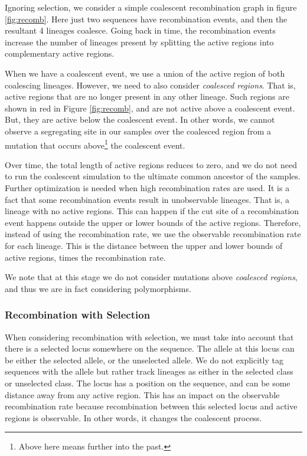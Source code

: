 \documentclass{article}
\begin{document}
Ignoring selection, we consider a simple coalescent recombination graph in
figure \ref{fig:recomb}. Here just two sequences have recombination
events, and then the resultant 4 lineages coalesce. Going back in time, the
recombination events increase the number of lineages present by splitting the
active regions into complementary active regions. 

When we have a coalescent event, we use a union of the active region of both
coalescing lineages. However, we need to also consider {\it coalesced regions}.
That is, active regions that are no longer present in any other lineage. Such
regions are shown in red in Figure \ref{fig:recomb}, and are not active above a
coalescent event. But, they are active below the coalescent event. In other
words, we cannot observe a segregating site in our samples over the coalesced
region from a mutation that occurs above\footnote{Above here means further into
the past.} the coalescent event.

Over time, the total length of active regions reduces to zero, and we do not
need to run the coalescent simulation to the ultimate common ancestor of the samples.
Further optimization is needed when high recombination rates are used. It
is a fact that some recombination events result in unobservable lineages.
That is, a lineage with no active regions. This can happen if the cut site of a
recombination event happens outside the upper or lower bounds of the active
regions. Therefore, instead of using the recombination rate, we use the
observable recombination rate for each lineage. This is the distance between
the upper and lower bounds of active regions, times the recombination rate.

We note that at this stage we do not consider mutations above {\it coalesced
regions}, and thus we are in fact considering polymorphisms.


\subsubsection{Recombination with Selection}

When considering recombination with selection, we must take into account that
there is a selected locus somewhere on the sequence. The allele at this locus can
be either the selected allele, or the unselected allele. We do not explicitly tag
sequences with the allele but rather track lineages as either in the  selected
class or unselected class. The locus has a position on the sequence, and can be
some distance away from any active region. This has an impact on the observable
recombination rate because recombination between this selected locus and active
regions is observable. In other words, it changes the coalescent process.
\end{document}
